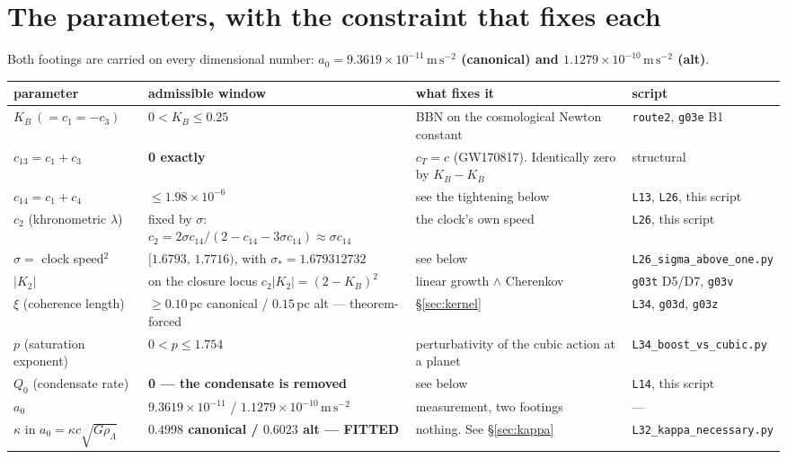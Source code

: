 \documentclass[11pt,letterpaper]{article}
\newcommand{\ms}{\,\mathrm{m\,s^{-2}}}
\begin{document}
\section{The parameters, with the constraint that fixes each}
Both footings are carried on every dimensional number: \textbf{$a_0=9.3619\times10^{-11}\ms$ (canonical) and $1.1279\times10^{-10}\ms$ (alt)}.

\begin{center}\small
\begin{tabular}{L{0.155\textwidth}L{0.285\textwidth}L{0.30\textwidth}L{0.15\textwidth}}\toprule
parameter & admissible window & what fixes it & script\\\midrule
$K_B\ (=c_1=-c_3)$ & $0<K_B\le0.25$ & BBN on the cosmological Newton constant & \texttt{route2}, \texttt{g03e} B1\\
$c_{13}=c_1+c_3$ & \textbf{0 exactly} & $c_T=c$ (GW170817). Identically zero by $K_B-K_B$ & structural\\
$c_{14}=c_1+c_4$ & $\le1.98\times10^{-6}$ & see the tightening below & \texttt{L13}, \texttt{L26}, this script\\
$c_2$ (khronometric $\lambda$) & fixed by $\sigma$: $c_2=2\sigma c_{14}/(2-c_{14}-3\sigma c_{14})\approx\sigma c_{14}$ & the clock's own speed & \texttt{L26}, this script\\
$\sigma=$ clock speed$^2$ & $[1.6793,\,1.7716)$, with $\sigma_*=1.679312732$ & see below & \texttt{L26\_sigma\_}\allowbreak\texttt{above\_one.py}\\
$|K_2|$ & on the closure locus $c_2|K_2|=(2-K_B)^2$ & linear growth $\wedge$ Cherenkov & \texttt{g03t} D5/D7, \texttt{g03v}\\
$\xi$ (coherence length) & $\ge0.10$\,pc canonical / $0.15$\,pc alt --- theorem-forced & \S\ref{sec:kernel} & \texttt{L34}, \texttt{g03d}, \texttt{g03z}\\
$p$ (saturation exponent) & $0<p\le1.754$ & perturbativity of the cubic action at a planet & \texttt{L34\_boost\_}\allowbreak\texttt{vs\_cubic.py}\\
$Q_0$ (condensate rate) & \textbf{0 --- the condensate is removed} & see below & \texttt{L14}, this script\\
$a_0$ & $9.3619\times10^{-11}$ / $1.1279\times10^{-10}\ms$ & measurement, two footings & ---\\
$\kappa$ in $a_0=\kappa c\sqrt{G\rho_\Lambda}$ & \textbf{$0.4998$ canonical / $0.6023$ alt --- FITTED} & nothing. See \S\ref{sec:kappa} & \texttt{L32\_kappa\_}\allowbreak\texttt{necessary.py}\\\bottomrule
\end{tabular}
\end{center}
\end{document}
